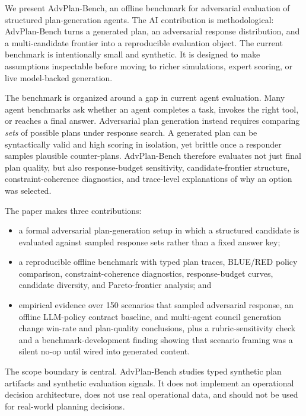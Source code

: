 \documentclass[letterpaper]{article} %
\begin{document}
We present AdvPlan-Bench, an offline benchmark for adversarial evaluation of structured plan-generation agents. The AI contribution is methodological: AdvPlan-Bench turns a generated plan, an adversarial response distribution, and a multi-candidate frontier into a reproducible evaluation object. The current benchmark is intentionally small and synthetic. It is designed to make assumptions inspectable before moving to richer simulations, expert scoring, or live model-backed generation.

The benchmark is organized around a gap in current agent evaluation. Many agent benchmarks ask whether an agent completes a task, invokes the right tool, or reaches a final answer. Adversarial plan generation instead requires comparing \emph{sets} of possible plans under response search. A generated plan can be syntactically valid and high scoring in isolation, yet brittle once a responder samples plausible counter-plans. AdvPlan-Bench therefore evaluates not just final plan quality, but also response-budget sensitivity, candidate-frontier structure, constraint-coherence diagnostics, and trace-level explanations of why an option was selected.

The paper makes three contributions:

\begin{itemize}
    \item a formal adversarial plan-generation setup in which a structured candidate is evaluated against sampled response sets rather than a fixed answer key;
    \item a reproducible offline benchmark with typed plan traces, BLUE/RED policy comparison, constraint-coherence diagnostics, response-budget curves, candidate diversity, and Pareto-frontier analysis; and
    \item empirical evidence over 150 scenarios that sampled adversarial response, an offline LLM-policy contract baseline, and multi-agent council generation change win-rate and plan-quality conclusions, plus a rubric-sensitivity check and a benchmark-development finding showing that scenario framing was a silent no-op until wired into generated content.
\end{itemize}

The scope boundary is central. AdvPlan-Bench studies typed synthetic plan artifacts and synthetic evaluation signals. It does not implement an operational decision architecture, does not use real operational data, and should not be used for real-world planning decisions.
\end{document}
